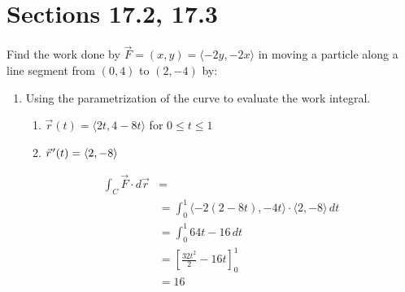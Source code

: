 \documentclass[letter,11pt]{article}
\newcommand{\pvec}[1]{\vec{#1}\mkern2mu\vphantom{#1}}
\begin{document}
\section*{Sections 17.2, 17.3}
Find the work done by $\vec{F}= (x, y) = \langle -2y,-2x \rangle$ in moving a particle along a line segment from $(0, 4)$ to $(2, -4)$ by:
\begin{enumerate}[label = \roman*.]
    \item Using the parametrization of the curve to evaluate the work integral.
    \begin{enumerate}[label=\alph*.)]
        \item $\vec{r}(t)=\langle 2t, 4-8t\rangle$ for $0 \leq t\leq 1$
        \item $\pvec{r}'(t)=\langle 2,-8\rangle$
    \end{enumerate}
    \begin{align*}
        \int_{C}\vec{F}\cdot d\vec{r} &=\\
        &= \int_{0}^{1} \langle -2(2-8t),-4t \rangle\cdot \langle 2,-8\rangle \, dt\\
        &= \int_{0}^{1} 64t-16 \, dt\\
        &= \left[\frac{32t^{2}}{2}-16t\right]_{0}^{1}\\
        &= \boxed{16}
    \end{align*}


\end{enumerate}
\end{document}
